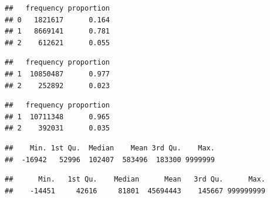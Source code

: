 \documentclass[
]{article}
\newenvironment{Shaded}{\begin{snugshade}}{\end{snugshade}}
\newcommand{\CommentTok}[1]{\textcolor[rgb]{0.56,0.35,0.01}{\textit{#1}}}
\newcommand{\FunctionTok}[1]{\textcolor[rgb]{0.13,0.29,0.53}{\textbf{#1}}}
\newcommand{\NormalTok}[1]{#1}
\newcommand{\SpecialCharTok}[1]{\textcolor[rgb]{0.81,0.36,0.00}{\textbf{#1}}}
\begin{document}
\begin{verbatim}
##   frequency proportion
## 0   1821617      0.164
## 1   8669141      0.781
## 2    612621      0.055
\end{verbatim}

\begin{Shaded}
\end{Shaded}

\begin{verbatim}
##   frequency proportion
## 1  10850487      0.977
## 2    252892      0.023
\end{verbatim}

\begin{Shaded}
\end{Shaded}

\begin{verbatim}
##   frequency proportion
## 1  10711348      0.965
## 2    392031      0.035
\end{verbatim}

\begin{Shaded}
\end{Shaded}

\begin{verbatim}
##    Min. 1st Qu.  Median    Mean 3rd Qu.    Max. 
##  -16942   52996  102407  583496  183300 9999999
\end{verbatim}

\begin{Shaded}
\end{Shaded}

\begin{verbatim}
##      Min.   1st Qu.    Median      Mean   3rd Qu.      Max. 
##    -14451     42616     81801  45694443    145667 999999999
\end{verbatim}
\end{document}
